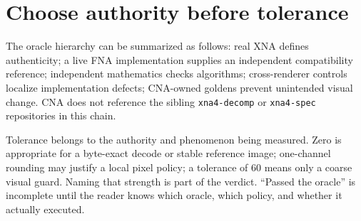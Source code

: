 \section{Choose authority before tolerance}

The oracle hierarchy can be summarized as follows: real XNA defines authenticity; a live FNA
implementation supplies an independent compatibility reference; independent mathematics checks
algorithms; cross-renderer controls localize implementation defects; CNA-owned goldens prevent
unintended visual change.  CNA does not reference the sibling \texttt{xna4-decomp} or
\texttt{xna4-spec} repositories in this chain.

Tolerance belongs to the authority and phenomenon being measured.  Zero is appropriate for a
byte-exact decode or stable reference image; one-channel rounding may justify a local pixel
policy; a tolerance of 60 means only a coarse visual guard.  Naming that strength is part of the
verdict.  ``Passed the oracle'' is incomplete until the reader knows which oracle, which policy,
and whether it actually executed.
